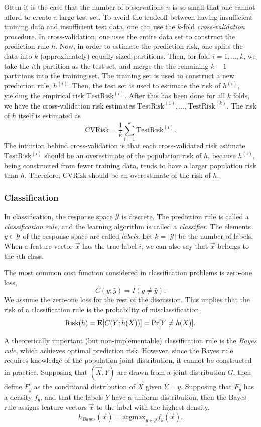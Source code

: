 Often it is the case that the number of observations $n$ is so small
that one cannot afford to create a large test set.  To avoid the
tradeoff between having insufficient training data and insufficient
test data, one can use the $k$-fold \emph{cross-validation} procedure.
In cross-validation, one uses the entire data set to construct the
prediction rule $h$.  Now, in order to estimate the prediction risk,
one splits the data into $k$ (approximately) equally-sized partitions.
Then, for fold $i = 1,\hdots, k$, we take the $i$th partition as the
test set, and merge the the remaining $k-1$ partitions into the
training set.  The training set is used to construct a new prediction
rule, $h^{(i)}$.  Then, the test set is used to estimate the risk of
$h^{(i)}$, yielding the empirical risk $\text{TestRisk}^{(i)}$.  After
this has been done for all $k$ folds, we have the cross-validation
risk estimates $\text{TestRisk}^{(1)},\hdots, \text{TestRisk}^{(k)}$.
The risk of $h$ itself is estimated as
\[
\text{CVRisk} = \frac{1}{k}\sum_{i=1}^k \text{TestRisk}^{(i)}.
\]
The intuition behind cross-validation is that each cross-validated
risk estimate $\text{TestRisk}^{(i)}$ should be an overestimate of the
population risk of $h$, because $h^{(i)}$, being constructed from
fewer training data, tends to have a larger population risk than $h$.
Therefore, $\text{CVRisk}$ should be an overestimate of the risk of
$h$.

\subsubsection{Classification}

In classification, the response space $\mathcal{Y}$ is discrete.  The
prediction rule is called a \emph{classification rule}, and the
learning algorithm is called a \emph{classifier}.  The elements $y \in
\mathcal{Y}$ of the response space are called \emph{labels}.  Let $k =
|\mathcal{Y}|$ be the number of labels.  When a feature vector
$\vec{x}$ has the true label $i$, we can also say that $\vec{x}$
belongs to the $i$th class.

The most common cost function considered in classification problems is
zero-one loss,
\[
C(y;\hat{y}) = I(y \neq \hat{y}).
\]
We assume the zero-one loss for the rest of the discussion.  This
implies that the risk of a classification rule is the probability of
misclassification,
\[
\text{Risk}(h) = \textbf{E}[C(Y; h(X))] = \Pr[Y \neq h(X)].
\]

A theoretically important (but non-implementable) classification rule
is the \emph{Bayes rule}, which achieves optimal prediction risk.
However, since the Bayes rule requires knowledge of the population
joint distribution, it cannot be constructed in practice.  Supposing
that $(\vec{X}, Y)$ are drawn from a joint distribution $G$, then
define $F_y$ as the conditional distribution of $\vec{X}$ given $Y =
y$.  Supposing that $F_y$ has a density $f_y$, and that the labels $Y$
have a uniform distribution, then the Bayes rule assigns feature
vectors $\vec{x}$ to the label with the highest density.
\[
h_{Bayes}(\vec{x}) = \text{argmax}_{y \in \mathcal{Y}} f_y(\vec{x}).
\]

